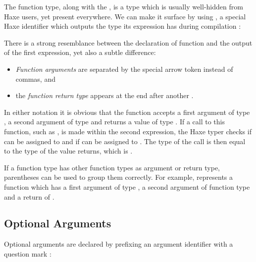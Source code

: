 
The function type, along with the , is a type which is usually well-hidden from Haxe users, yet present everywhere. We can make it surface by using , a special Haxe identifier which outputs the type its expression has during compilation :


There is a strong resemblance between the declaration of function  and the output of the first  expression, yet also a subtle difference:

\begin{itemize}
	\item \emph{Function arguments} are separated by the special arrow token \expr{->} instead of commas, and
	\item the \emph{function return type} appears at the end after another \expr{->}.
\end{itemize}

In either notation it is obvious that the function  accepts a first argument of type , a second argument of type  and returns a value of type . If a call to this function, such as , is made within the second  expression, the Haxe typer checks if  can be assigned to  and if  can be assigned to . The type of the call is then equal to the type of the value  returns, which is .

If a function type has other function types as argument or return type, parentheses can be used to group them correctly. For example,  represents a function which has a first argument of type , a second argument of function type  and a return of .



\subsection{Optional Arguments}
\label{types-function-optional-arguments}

Optional arguments are declared by prefixing an argument identifier with a question mark :

